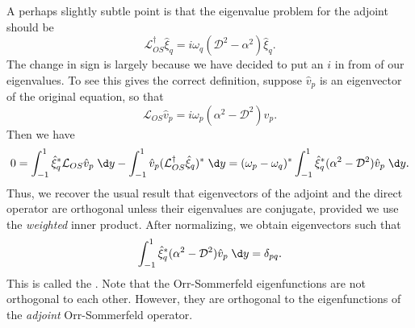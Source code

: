 \documentclass[a4paper]{article}
\begin{document}
A perhaps slightly subtle point is that the eigenvalue problem for the adjoint should be
\[
  \mathcal{L}_{OS}^\dagger \hat{\xi}_q = i \omega_q(\mathcal{D}^2 - \alpha^2) \hat{\xi}_q.
\]
The change in sign is largely because we have decided to put an $i$ in from of our eigenvalues. To see this gives the correct definition, suppose $\hat{v}_p$ is an eigenvector of the original equation, so that
\[
  \mathcal{L}_{OS}\hat{v}_p = i\omega_p (\alpha^2 - \mathcal{D}^2) \hat{v}_p.
\]
Then we have
\[
  0 = \int_{-1}^1 \hat{\xi}_q^* \mathcal{L}_{OS} \hat{v}_p\;\d y - \int_{-1}^1 \hat{v}_p (\mathcal{L}_{OS}^\dagger \hat{\xi}_q)^* \;\d y = (\omega_p - \omega_q)^* \int_{-1}^1 \hat{\xi}_q^* (\alpha^2 - \mathcal{D}^2) \hat{v}_p \;\d y.
\]
Thus, we recover the usual result that eigenvectors of the adjoint and the direct operator are orthogonal unless their eigenvalues are conjugate, provided we use the \emph{weighted} inner product. After normalizing, we obtain eigenvectors such that
%
%
\[
  \int_{-1}^1 \hat{\xi}_q^*( \alpha^2 - \mathcal{D}^2) \hat{v}_p \;\d y = \delta_{pq}.
\]
This is called the . Note that the Orr-Sommerfeld eigenfunctions are not orthogonal to each other. However, they are orthogonal to the eigenfunctions of the \emph{adjoint} Orr-Sommerfeld operator.
\end{document}
